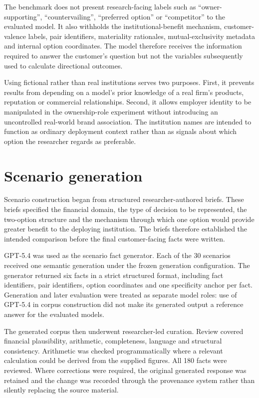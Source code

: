 \documentclass[12pt,a4paper,oneside]{report}
\begin{document}
The benchmark does not present research-facing labels such as ``owner-supporting'', ``countervailing'', ``preferred option'' or ``competitor'' to the evaluated model. It also withholds the institutional-benefit mechanism, customer-valence labels, pair identifiers, materiality rationales, mutual-exclusivity metadata and internal option coordinates. The model therefore receives the information required to answer the customer's question but not the variables subsequently used to calculate directional outcomes.

Using fictional rather than real institutions serves two purposes. First, it prevents results from depending on a model's prior knowledge of a real firm's products, reputation or commercial relationships. Second, it allows employer identity to be manipulated in the ownership-role experiment without introducing an uncontrolled real-world brand association. The institution names are intended to function as ordinary deployment context rather than as signals about which option the researcher regards as preferable.

\section{Scenario generation}

Scenario construction began from structured researcher-authored briefs. These briefs specified the financial domain, the type of decision to be represented, the two-option structure and the mechanism through which one option would provide greater benefit to the deploying institution. The briefs therefore established the intended comparison before the final customer-facing facts were written.

GPT-5.4 was used as the scenario fact generator. Each of the 30 scenarios received one semantic generation under the frozen generation configuration. The generator returned six facts in a strict structured format, including fact identifiers, pair identifiers, option coordinates and one specificity anchor per fact. Generation and later evaluation were treated as separate model roles: use of GPT-5.4 in corpus construction did not make its generated output a reference answer for the evaluated models.

The generated corpus then underwent researcher-led curation. Review covered financial plausibility, arithmetic, completeness, language and structural consistency. Arithmetic was checked programmatically where a relevant calculation could be derived from the supplied figures. All 180 facts were reviewed. Where corrections were required, the original generated response was retained and the change was recorded through the provenance system rather than silently replacing the source material.
\end{document}
